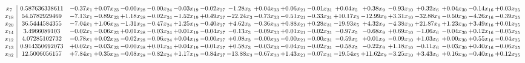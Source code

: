 \documentclass[9pt]{article}
\begin{document}
 \[\begin{array}{c| c c@{\hskip 2pt} c@{\hskip 2pt} c@{\hskip 2pt} c@{\hskip 2pt} c@{\hskip 2pt} c@{\hskip 2pt} c@{\hskip 2pt} c@{\hskip 2pt} c@{\hskip 2pt} c@{\hskip 2pt} c@{\hskip 2pt} c@{\hskip 2pt} c@{\hskip 2pt} c@{\hskip 2pt} c@{\hskip 2pt} c@{\hskip 2pt} c@{\hskip 2pt} }
 x_{7}   &  0.587636338611 & -0.37 x_{1} & +  0.07 x_{23} & -0.00 x_{28} & -0.00 x_{24} & -0.03 x_{19} & -0.02 x_{27} & -1.28 x_{3} & +  0.04 x_{33} & +  0.06 x_{21} & -0.01 x_{31} & +  0.04 x_{5} & +  0.38 x_{9} & -0.93 x_{10} & +  0.32 x_{6} & +  0.04 x_{30} & -0.14 x_{16} & +  0.03 x_{25}\\
 x_{18}   &  54.5782929469 & -7.13 x_{1} & -0.89 x_{23} & +  1.18 x_{28} & -0.02 x_{24} & -1.52 x_{19} & +  0.49 x_{27} & -22.24 x_{3} & -0.73 x_{33} & -0.51 x_{21} & -0.33 x_{31} & + 10.17 x_{5} & -12.99 x_{9} & +  3.31 x_{10} & -32.88 x_{6} & -0.50 x_{30} & -4.26 x_{16} & -0.39 x_{25}\\
 x_{20}   &  36.5444584355 & -7.04 x_{1} & +  1.06 x_{23} & -1.31 x_{28} & -0.47 x_{24} & +  1.25 x_{19} & -0.40 x_{27} & +  4.62 x_{3} & -0.36 x_{33} & +  0.88 x_{21} & +  0.28 x_{31} & -19.93 x_{5} & +  4.32 x_{9} & -4.38 x_{10} & + 21.87 x_{6} & +  1.23 x_{30} & +  3.49 x_{16} & +  0.01 x_{25}\\
 x_{14}   &  3.4966089103 & -0.02 x_{1} & -0.06 x_{23} & +  0.01 x_{28} & -0.03 x_{24} & +  0.01 x_{19} & -0.04 x_{27} & -0.13 x_{3} & -0.09 x_{33} & +  0.01 x_{21} & -0.02 x_{31} & -0.97 x_{5} & -0.68 x_{9} & +  0.69 x_{10} & -1.06 x_{6} & -0.04 x_{30} & +  0.12 x_{16} & -0.05 x_{25}\\
 x_{12}   &  4.07285102732 & -0.78 x_{1} & +  0.02 x_{23} & -0.02 x_{28} & -0.06 x_{24} & +  0.04 x_{19} & -0.00 x_{27} & +  0.08 x_{3} & -0.00 x_{33} & -0.00 x_{21} & -0.00 x_{31} & -0.59 x_{5} & +  0.01 x_{9} & -0.09 x_{10} & +  1.03 x_{6} & +  0.00 x_{30} & +  0.55 x_{16} & -0.04 x_{25}\\
 x_{13}   &  0.914350692073 & +  0.02 x_{1} & -0.03 x_{23} & -0.00 x_{28} & +  0.01 x_{24} & +  0.04 x_{19} & -0.01 x_{27} & +  0.58 x_{3} & -0.03 x_{33} & -0.04 x_{21} & -0.02 x_{31} & -0.58 x_{5} & -0.22 x_{9} & +  1.18 x_{10} & -0.11 x_{6} & -0.03 x_{30} & +  0.40 x_{16} & -0.06 x_{25}\\
 x_{32}   &  12.5006056157 & +  7.84 x_{1} & +  0.35 x_{23} & -0.08 x_{28} & -0.82 x_{24} & +  1.17 x_{19} & -0.84 x_{27} & -13.88 x_{3} & -0.67 x_{33} & +  1.43 x_{21} & -0.07 x_{31} & -19.54 x_{5} & + 11.62 x_{9} & -3.25 x_{10} & +  3.43 x_{6} & +  0.16 x_{30} & -0.40 x_{16} & +  0.12 x_{25}\\

\end{array}\]
\end{document}
